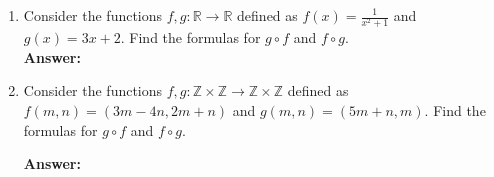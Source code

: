 \documentclass[11pt]{report}
\theoremstyle{plain}
\newcommand{\Z}{\mathbb{Z}}
\newcommand{\R}{\mathbb{R}}
\begin{document}
\begin{enumerate}
\textbf{Answer:} \\




\item[\textbf{2.4.6}] Consider the functions $f,g: \R \to \R$ defined as $f(x)=\frac{1}{x^2+1}$ and $g(x)=3x+2.$ Find the formulas for $g \circ f$ and $f \circ g.$\\

\textbf{Answer:} \\

\item[\textbf{12.4.8}] Consider the functions $f , g : \Z \times \Z \to \Z \times \Z$ defined as $f (m,n) = (3m-4n,2m+n)$ and $g(m,n) = (5m+ n,m).$ Find the formulas for $g \circ f$ and $f \circ g.$

\textbf{Answer:} \\
\end{enumerate}
\end{document}
